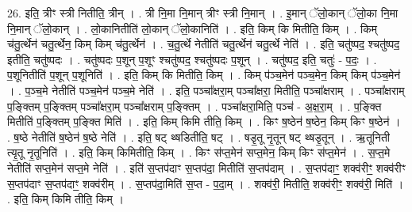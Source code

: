 \documentclass[17pt]{extarticle}
\begin{document}
26. इति॒ त्रीꣳ स्त्री नितीति॒ त्रीन् । . त्री नि॒मा नि॒मान् त्रीꣳ स्त्री नि॒मान् । . इ॒मान् ॅलो॒कान् ॅलो॒का नि॒मा नि॒मान् ॅलो॒कान् । . लो॒कानितीति॑ लो॒कान् ॅलो॒कानिति॑ । . इति॒ किम् कि मितीति॒ किम् । . किम् च॑तु॒र्त्थेन॑ चतु॒र्त्थेन॒ किम् किम् च॑तु॒र्त्थेन॑ । . च॒तु॒र्त्थे नेतीति॑ चतु॒र्त्थेन॑ चतु॒र्त्थे नेति॑ । . इति॒ चतु॑ष्पद॒ श्चतु॑ष्पद॒ इतीति॒ चतु॑ष्पदः । . चतु॑ष्पदः प॒शून् प॒शूꣳ श्चतु॑ष्पद॒ श्चतु॑ष्पदः प॒शून् । . चतु॑ष्पद॒ इति॒ चतुः॑ - प॒दः॒ । . प॒शूनितीति॑ प॒शून् प॒शूनिति॑ । . इति॒ किम् कि मितीति॒ किम् । . किम् प॑ञ्च॒मेन॑ पञ्च॒मेन॒ किम् किम् प॑ञ्च॒मेन॑ । . प॒ञ्च॒मे नेतीति॑ पञ्च॒मेन॑ पञ्च॒मे नेति॑ । . इति॒ पञ्चा᳚क्षरा॒म् पञ्चा᳚क्षरा॒ मितीति॒ पञ्चा᳚क्षराम् । . पञ्चा᳚क्षराम् प॒ङ्क्तिम् प॒ङ्क्तिम् पञ्चा᳚क्षरा॒म् पञ्चा᳚क्षराम् प॒ङ्क्तिम् । . पञ्चा᳚क्षरा॒मिति॒ पञ्च॑ - अ॒क्ष॒रा॒म् । . प॒ङ्क्ति मितीति॑ प॒ङ्क्तिम् प॒ङ्क्ति मिति॑ । . इति॒ किम् किमि तीति॒ किम् । . किꣳ ष॒ष्ठेन॑ ष॒ष्ठेन॒ किम् किꣳ ष॒ष्ठेन॑ । . ष॒ष्ठे नेतीति॑ ष॒ष्ठेन॑ ष॒ष्ठे नेति॑ । . इति॒ षट् थ्षडितीति॒ षट् । . षडृ॒तू नृ॒तून् षट् थ्षडृ॒तून् । . ऋ॒तूनिती त्यृ॒तू नृ॒तूनिति॑ । . इति॒ किम् किमितीति॒ किम् । . किꣳ स॑प्त॒मेन॑ सप्त॒मेन॒ किम् किꣳ स॑प्त॒मेन॑ । . स॒प्त॒मे नेतीति॑ सप्त॒मेन॑ सप्त॒मे नेति॑ । . इति॑ स॒प्तप॑दाꣳ स॒प्तप॑दा॒ मितीति॑ स॒प्तप॑दाम् । . स॒प्तप॑दाꣳ॒॒ शक्व॑रीꣳ॒॒ शक्व॑रीꣳ स॒प्तप॑दाꣳ स॒प्तप॑दाꣳ॒॒ शक्व॑रीम् । . स॒प्तप॑दा॒मिति॑ स॒प्त - प॒दा॒म् । . शक्व॑री॒ मितीति॒ शक्व॑रीꣳ॒॒ शक्व॑री॒ मिति॑ । . इति॒ किम् किमि तीति॒ किम् । \newline
\end{document}
